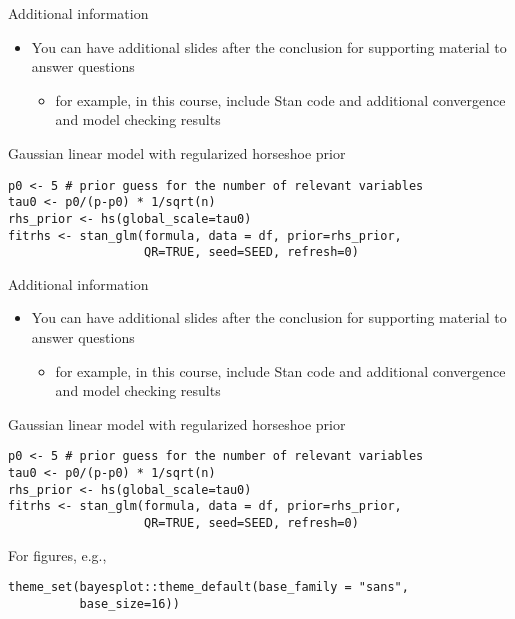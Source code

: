 \documentclass[english,t]{beamer}
\begin{document}
\begin{frame}[fragile]

  {\Large\color{navyblue} Additional information}

  \begin{itemize}
  \item You can have additional slides after the conclusion for
    supporting material to answer questions
    \begin{itemize}
    \item for example, in this course, include Stan code and
      additional convergence and model checking results
    \end{itemize}
  \end{itemize}


Gaussian linear model with regularized horseshoe prior
  
  {\footnotesize
\begin{lstlisting}
p0 <- 5 # prior guess for the number of relevant variables
tau0 <- p0/(p-p0) * 1/sqrt(n)
rhs_prior <- hs(global_scale=tau0)
fitrhs <- stan_glm(formula, data = df, prior=rhs_prior, 
                   QR=TRUE, seed=SEED, refresh=0)
\end{lstlisting}
  }


\end{frame}

\begin{frame}[fragile]

  {\Large\color{navyblue} Additional information}

  \begin{itemize}
  \item You can have additional slides after the conclusion for
    supporting material to answer questions
    \begin{itemize}
    \item for example, in this course, include Stan code and
      additional convergence and model checking results
    \end{itemize}
  \end{itemize}


Gaussian linear model with regularized horseshoe prior
  
  {\footnotesize
\begin{lstlisting}
p0 <- 5 # prior guess for the number of relevant variables
tau0 <- p0/(p-p0) * 1/sqrt(n)
rhs_prior <- hs(global_scale=tau0)
fitrhs <- stan_glm(formula, data = df, prior=rhs_prior, 
                   QR=TRUE, seed=SEED, refresh=0)
\end{lstlisting}
  }

For figures, e.g.,
  
  {\footnotesize
\begin{lstlisting}
theme_set(bayesplot::theme_default(base_family = "sans",
          base_size=16))
\end{lstlisting}
  }

\end{frame}
\end{document}
